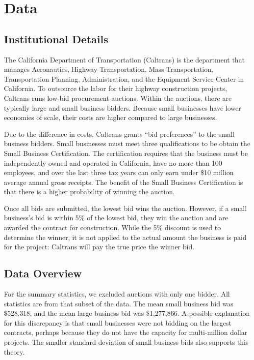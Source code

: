 \section{Data}

\subsection{Institutional Details}

The California Department of Transportation (Caltrans) is the department that
manages Aeronautics, Highway Transportation, Mass Transportation,
Transportation Planning, Administration, and the Equipment Service Center in
California. To outsource the labor for their highway construction projects,
Caltrans runs low-bid procurement auctions. Within the auctions, there are
typically large and small business bidders. Because small businesses have lower
economies of scale, their costs are higher compared to large businesses.

Due to the difference in costs, Caltrans grants ``bid preferences'' to the small
business bidders. Small businesses must meet three qualifications to be obtain
the Small Business Certification. The certification requires that the business
must be independently owned and operated in California, have no more than 100
employees, and over the last three tax years can only earn under \$10 million
average annual gross receipts. The benefit of the Small Business Certification
is that there is a higher probability of winning the auction.

Once all bids are submitted, the lowest bid wins the auction. However, if a
small business’s bid is within 5\% of the lowest bid, they win the auction and
are awarded the contract for construction. While the 5\% discount is used to
determine the winner, it is not applied to the actual amount the business is
paid for the project: Caltrans will pay the true price the winner bid.

\subsection{Data Overview}



For the summary statistics, we excluded auctions with only one bidder. All statistics
are from that subset of the data.
The mean small business bid was \$528,318, and the mean large business bid
was \$1,277,866.
A possible explanation for this discrepancy is that small businesses were not
bidding on the largest contracts, perhaps because they do not have the
capacity for multi-million dollar projects. The smaller standard deviation of
small business bids also supports this theory.


